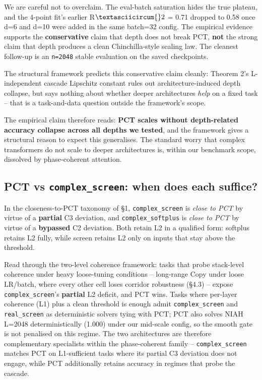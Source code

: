 \documentclass[11pt,a4paper]{article}
\theoremstyle{plain}
\theoremstyle{definition}
\begin{document}
We are careful not to overclaim. The eval-batch saturation hides the true plateau, and the 4-point fit's earlier R$\textasciicircum{}2$ = 0.71 dropped to 0.58 once d=6 and d=10 were added in the same batch=32 config. The empirical evidence supports the \textbf{conservative} claim that depth does not break PCT, \textbf{not} the strong claim that depth produces a clean Chinchilla-style scaling law. The cleanest follow-up is an \texttt{n=2048} stable evaluation on the saved checkpoints.

The structural framework predicts this conservative claim cleanly: Theorem 2's L-independent cascade Lipschitz constant rules out architecture-induced depth collapse, but says nothing about whether deeper architectures \emph{help} on a fixed task -- that is a task-and-data question outside the framework's scope.

The empirical claim therefore reads: \textbf{PCT scales without depth-related accuracy collapse across all depths we tested}, and the framework gives a structural reason to expect this generalises. The standard worry that complex transformers do not scale to deeper architectures is, within our benchmark scope, dissolved by phase-coherent attention.

\subsection{PCT vs \texttt{complex\_screen}: when does each suffice?}
In the closeness-to-PCT taxonomy of \S{}1, \texttt{complex\_screen} is \emph{close to PCT} by virtue of a \textbf{partial} C3 deviation, and \texttt{complex\_softplus} is \emph{close to PCT} by virtue of a \textbf{bypassed} C2 deviation. Both retain L2 in a qualified form: softplus retains L2 fully, while screen retains L2 only on inputs that stay above the threshold.

Read through the two-level coherence framework: tasks that probe stack-level coherence under heavy loose-tuning conditions -- long-range Copy under loose LR/batch, where every other cell loses corridor robustness (\S{}4.3) -- expose \texttt{complex\_screen}'s \textbf{partial} L2 deficit, and PCT wins. Tasks where per-layer coherence (L1) plus a clean threshold is enough admit \texttt{complex\_screen} and \texttt{real\_screen} as deterministic solvers tying with PCT; PCT also solves NIAH L=2048 deterministically (1.000) under our mid-scale config, so the smooth gate is not penalised on this regime. The two architectures are therefore complementary specialists within the phase-coherent family -- \texttt{complex\_screen} matches PCT on L1-sufficient tasks where its partial C3 deviation does not engage, while PCT additionally retains accuracy in regimes that probe the cascade.
\end{document}
